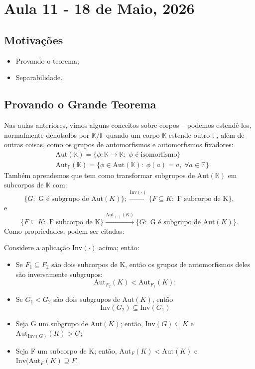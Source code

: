 \documentclass[../algebraIII_notes.tex]{subfiles}
\begin{document}
\section{Aula 11 - 18 de Maio, 2026}
\subsection{Motivações}
\begin{itemize}
	\item Provando o teorema;
	\item Separabilidade.
\end{itemize}
\subsection{Provando o Grande Teorema}
Nas aulas anteriores, vimos alguns conceitos sobre corpos -- podemos estendê-los, normalmente denotados por \(\mathbb{K}/\mathbb{F}\) quando um corpo \(\mathbb{K}\) estende outro \(\mathbb{F}\), além de outras coisas, como os grupos de automorfismos e automorfismos fixadores:
\begin{align*}
	 & \mathrm{Aut}(\mathbb{K})=\{\phi :\mathbb{K}\rightarrow \mathbb{K}:\; \phi \text{ é isomorfismo}  \}                   \\
	 & \mathrm{Aut}_{\mathbb{F}}(\mathbb{K})=\{\phi \in \mathrm{Aut}(\mathbb{K}):\; \phi(a)=a,\; \forall a\in \mathbb{F}  \}
\end{align*}
Também aprendemos que tem como transformar subgrupos de \(\mathrm{Aut}(\mathbb{K})\) em subcorpos de \(\mathbb{K}\) com:
\[
	\{G: \text{ G é subgrupo de }\mathrm{Aut}(K)\};\stackrel{\mathrm{Inv}(\cdot )}\longrightarrow \{F\subseteq K: \text{ F subcorpo de K}\},
\]
e
\[
	\{F\subseteq K: \text{ F subcorpo de K}\} \stackrel{\mathrm{Aut}_{(\cdot )}(K)}\longrightarrow \{G: \text{ G é subgrupo de }\mathrm{Aut}(K)\}.
\]
Como propriedades, podem ser citadas:
\begin{lemma*}
	Considere a aplicação \(\mathrm{Inv}(\cdot )\) acima; então:
	\begin{itemize}
		\item[1)] Se \(F_1\subseteq F_2\) são dois subcorpos de K, então os grupos de automorfismos deles são inversamente subgrupos:
		      \[
			      \mathrm{Aut}_{F_{2}}(K) < \mathrm{Aut}_{F_1}(K);
		      \]
		\item[2)] Se \(G_1 < G_2\) são dois subgrupos de \(\mathrm{Aut}(K)\), então
		      \[
			      \mathrm{Inv}(G_2)\subseteq \mathrm{Inv}(G_1)
		      \]
		\item[3)] Seja G um subgrupo de \(\mathrm{Aut}(K)\); então, \(\mathrm{Inv}(G)\subseteq K\) e \(\mathrm{Aut}_{\mathrm{Inv}(G)}(K)>G\);
		\item[4)] Seja F um subcorpo de K; então, \(\mathrm{Aut}_{F}(K) < \mathrm{Aut}(K)\) e \(\mathrm{Inv}(\mathrm{Aut}_{F}(K)\supseteq F\).
	\end{itemize}
\end{lemma*}
\end{document}
